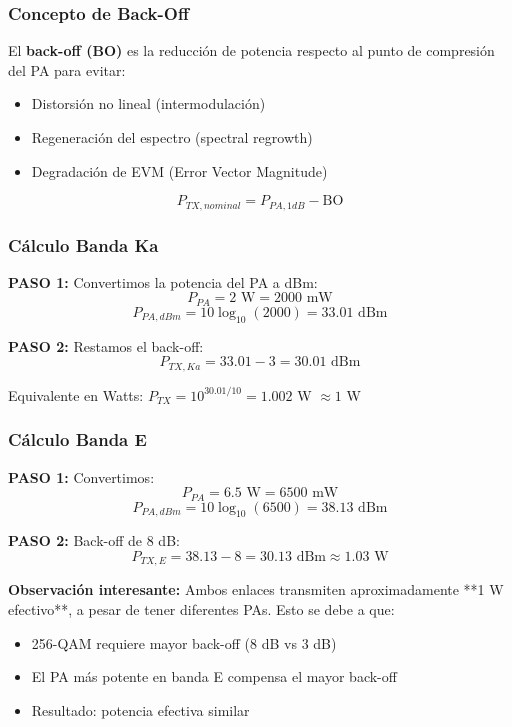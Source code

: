 \documentclass[a4paper,10pt]{article}
\begin{document}
\subsubsection{Concepto de Back-Off}

El \textbf{back-off (BO)} es la reducción de potencia respecto al punto de compresión del PA para evitar:
\begin{itemize}
    \item Distorsión no lineal (intermodulación)
    \item Regeneración del espectro (spectral regrowth)
    \item Degradación de EVM (Error Vector Magnitude)
\end{itemize}

$$P_{TX,nominal} = P_{PA,1dB} - \text{BO}$$

\subsubsection{Cálculo Banda Ka}

\textbf{PASO 1:} Convertimos la potencia del PA a dBm:
$$P_{PA} = 2 \text{ W} = 2000 \text{ mW}$$
$$P_{PA,dBm} = 10\log_{10}(2000) = 33.01 \text{ dBm}$$

\textbf{PASO 2:} Restamos el back-off:
$$P_{TX,Ka} = 33.01 - 3 = \boxed{30.01 \text{ dBm}}$$

Equivalente en Watts: $P_{TX} = 10^{30.01/10} = 1.002$ W $\approx 1$ W

\subsubsection{Cálculo Banda E}

\textbf{PASO 1:} Convertimos:
$$P_{PA} = 6.5 \text{ W} = 6500 \text{ mW}$$
$$P_{PA,dBm} = 10\log_{10}(6500) = 38.13 \text{ dBm}$$

\textbf{PASO 2:} Back-off de 8 dB:
$$P_{TX,E} = 38.13 - 8 = \boxed{30.13 \text{ dBm}} \approx 1.03 \text{ W}$$

\textbf{Observación interesante:} Ambos enlaces transmiten aproximadamente **1 W efectivo**, a pesar de tener diferentes PAs. Esto se debe a que:
\begin{itemize}
    \item 256-QAM requiere mayor back-off (8 dB vs 3 dB)
    \item El PA más potente en banda E compensa el mayor back-off
    \item Resultado: potencia efectiva similar
\end{itemize}
\end{document}
